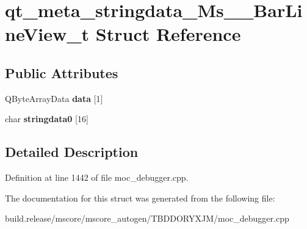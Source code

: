 \hypertarget{structqt__meta__stringdata___ms_____bar_line_view__t}{}\section{qt\+\_\+meta\+\_\+stringdata\+\_\+\+Ms\+\_\+\+\_\+\+Bar\+Line\+View\+\_\+t Struct Reference}
\label{structqt__meta__stringdata___ms_____bar_line_view__t}
\subsection*{Public Attributes}
\begin{DoxyCompactItemize}
\item 
\mbox{\label{structqt__meta__stringdata___ms_____bar_line_view__t_a9764b085002d320dc643b3de8f9745fc}} 
Q\+Byte\+Array\+Data {\bfseries data} \mbox{[}1\mbox{]}
\item 
\mbox{\label{structqt__meta__stringdata___ms_____bar_line_view__t_aeb77f2ffb058e8521acd7675050cf5ae}} 
char {\bfseries stringdata0} \mbox{[}16\mbox{]}
\end{DoxyCompactItemize}


\subsection{Detailed Description}


Definition at line 1442 of file moc\+\_\+debugger.\+cpp.



The documentation for this struct was generated from the following file\+:\begin{DoxyCompactItemize}
\item 
build.\+release/mscore/mscore\+\_\+autogen/\+T\+B\+D\+D\+O\+R\+Y\+X\+J\+M/moc\+\_\+debugger.\+cpp\end{DoxyCompactItemize}
